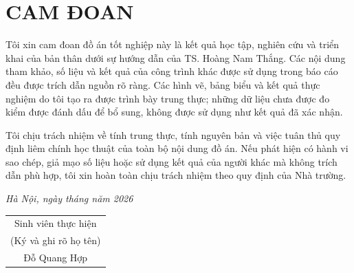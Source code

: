 \chapter*{CAM ĐOAN}

Tôi xin cam đoan đồ án tốt nghiệp này là kết quả học tập, nghiên cứu và triển
khai của bản thân dưới sự hướng dẫn của TS. Hoàng Nam Thắng. Các nội dung
tham khảo, số liệu và kết quả của công trình khác được sử dụng trong báo cáo đều
được trích dẫn nguồn rõ ràng. Các hình vẽ, bảng biểu và kết quả thực nghiệm do
tôi tạo ra được trình bày trung thực; những dữ liệu chưa được đo kiểm được đánh
dấu để bổ sung, không được sử dụng như kết quả đã xác nhận.

Tôi chịu trách nhiệm về tính trung thực, tính nguyên bản và việc tuân thủ
quy định liêm chính học thuật của toàn bộ nội dung đồ án. Nếu phát hiện có hành
vi sao chép, giả mạo số liệu hoặc sử dụng kết quả của người khác mà không trích
dẫn phù hợp, tôi xin hoàn toàn chịu trách nhiệm theo quy định của Nhà trường.

\begin{flushright}
\textit{Hà Nội, ngày  tháng  năm 2026}\\
\begin{tabular}{c}
Sinh viên thực hiện\\
(Ký và ghi rõ họ tên)\\[1.8cm]
Đỗ Quang Hợp
\end{tabular}
\end{flushright}
